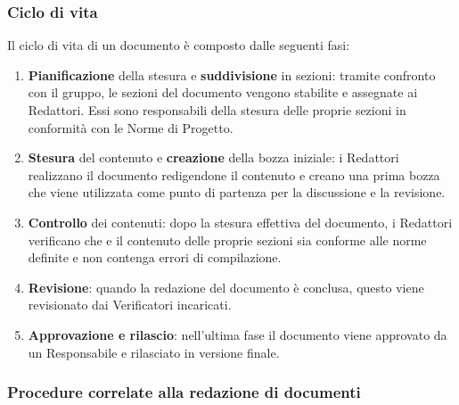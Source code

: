 \subsubsection{Ciclo di vita}
Il ciclo di vita di un documento è composto dalle seguenti fasi:
\begin{enumerate}
	\item \textbf{Pianificazione} della stesura e \textbf{suddivisione} in sezioni: tramite confronto con il gruppo, le sezioni del documento vengono stabilite e assegnate ai Redattori.
	      Essi sono responsabili della stesura delle proprie sezioni in conformità con le Norme di Progetto.
	\item \textbf{Stesura} del contenuto e \textbf{creazione} della bozza iniziale: i Redattori realizzano il documento redigendone il contenuto e creano una prima bozza
	      che viene utilizzata come punto di partenza per la discussione e la revisione.
	\item \textbf{Controllo} dei contenuti: dopo la stesura effettiva del documento, i Redattori verificano che e il contenuto delle proprie sezioni
	      sia conforme alle norme definite e non contenga errori di compilazione.
	\item \textbf{Revisione}: quando la redazione del documento è conclusa, questo viene revisionato dai Verificatori incaricati.
	\item \textbf{Approvazione e rilascio}: nell'ultima fase il documento viene approvato da un Responsabile e rilasciato in versione finale.
\end{enumerate}

\subsubsection{Procedure correlate alla redazione di documenti}

